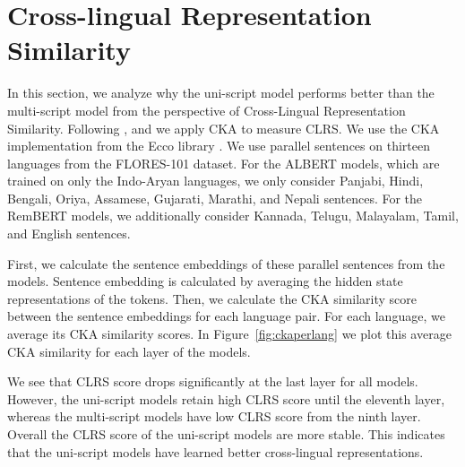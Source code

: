 \documentclass[11pt]{article}
\begin{document}
\section{Cross-lingual Representation Similarity}
\label{CLRS}
\begin{figure*}[!htbp]
\begin{center}
\hfill
{}
\vfill
{}
\hfill
{}
\caption{CKA Similarity Score for the multi-script and uni-script models}
\label{fig:ckaperlang}
\end{center}
\end{figure*}
In this section, we analyze why the uni-script model performs better than the multi-script model from the perspective of Cross-Lingual Representation Similarity.
Following \citep{Muller2021FirstAT}, \citep{Wu2020EmergingCS} and \citep{Del2021EstablishingII} we apply CKA to measure CLRS. We use the CKA implementation from the Ecco library \citep{alammar-2021-ecco}. We use parallel sentences on thirteen languages from the FLORES-101 \citep{Goyal2021TheFE} dataset. For the ALBERT models, which are trained on only the Indo-Aryan languages, we only consider Panjabi, Hindi, Bengali, Oriya, Assamese, Gujarati, Marathi, and Nepali sentences. For the RemBERT models, we additionally consider Kannada, Telugu, Malayalam, Tamil, and English sentences.

First, we calculate the sentence embeddings of these parallel sentences from the models. Sentence embedding is calculated by averaging the hidden state representations of the tokens. Then, we calculate the CKA similarity score between the sentence embeddings for each language pair. For each language, we average its CKA similarity scores. In Figure~\ref{fig:ckaperlang} we plot this average CKA similarity for each layer of the models.

We see that CLRS score drops significantly at the last layer for all models. However, the uni-script models retain high CLRS score until the eleventh layer, whereas the multi-script models have low CLRS score from the ninth layer.
Overall the CLRS score of the uni-script models are more stable. This indicates that the uni-script models have learned better cross-lingual representations.
\end{document}
